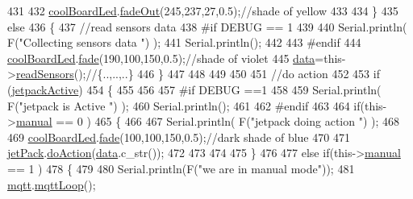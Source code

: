 \begin{DoxyCode}
431         
432         \hyperlink{class_cool_board_a1b1d3c684a5baa56b08486e192fd8e97}{coolBoardLed}.\hyperlink{class_cool_board_led_a93d545679237e8cc858324367149775c}{fadeOut}(245,237,27,0.5);\textcolor{comment}{//shade of yellow}
433                 
434     \}   
435     \textcolor{keywordflow}{else}
436     \{
437         \textcolor{comment}{//read sensors data}
438 \textcolor{preprocessor}{    #if DEBUG == 1}
439 
440         Serial.println( F(\textcolor{stringliteral}{"Collecting sensors data "}) );
441         Serial.println();
442     
443 \textcolor{preprocessor}{    #endif}
444         \hyperlink{class_cool_board_a1b1d3c684a5baa56b08486e192fd8e97}{coolBoardLed}.\hyperlink{class_cool_board_led_af1cacbaa88db8bcf6042c1083ba41155}{fade}(190,100,150,0.5);\textcolor{comment}{//shade of violet        }
445         \hyperlink{class_cool_board_a427fb753dd8575bdf821c70a5c63d695}{data}=this->\hyperlink{class_cool_board_ad03abdce2e65f520bbf2cff0f2d083cf}{readSensors}();\textcolor{comment}{//\{..,..,..\}}
446     \}
447     
448 
449 
450 
451     \textcolor{comment}{//do action}
452 
453     \textcolor{keywordflow}{if} (\hyperlink{class_cool_board_a9be03a913d26e558328935ca3b59a75e}{jetpackActive})
454     \{
455 
456 
457 \textcolor{preprocessor}{    #if DEBUG ==1}
458 
459         Serial.println( F(\textcolor{stringliteral}{"jetpack is Active "}) );
460         Serial.println();
461 
462 \textcolor{preprocessor}{    #endif}
463     
464         \textcolor{keywordflow}{if}(this->\hyperlink{class_cool_board_a7c8e505a5804b109e112d5a03df6ea2b}{manual} == 0 )
465         \{
466 
467             Serial.println( F(\textcolor{stringliteral}{"jetpack doing action "}) );
468 
469             \hyperlink{class_cool_board_a1b1d3c684a5baa56b08486e192fd8e97}{coolBoardLed}.\hyperlink{class_cool_board_led_af1cacbaa88db8bcf6042c1083ba41155}{fade}(100,100,150,0.5);\textcolor{comment}{//dark shade of blue     }
470 
471             \hyperlink{class_cool_board_a30b1357881b01ccbec676856a91e48e9}{jetPack}.\hyperlink{class_jetpack_a9e703197093094b963f9ad57817495b8}{doAction}(\hyperlink{class_cool_board_a427fb753dd8575bdf821c70a5c63d695}{data}.c\_str());
472             
473 
474         
475         \}
476         
477         \textcolor{keywordflow}{else} \textcolor{keywordflow}{if}(this->\hyperlink{class_cool_board_a7c8e505a5804b109e112d5a03df6ea2b}{manual} == 1 )
478         \{
479         
480             Serial.println(F(\textcolor{stringliteral}{"we are in manual mode"}));
481             \hyperlink{class_cool_board_a2399f44d7c23c1149a335cb3b46d90f1}{mqtt}.\hyperlink{class_cool_m_q_t_t_aa5eaae967b562b62cbcf2b8d81f6e5d5}{mqttLoop}();

\end{DoxyCode}

